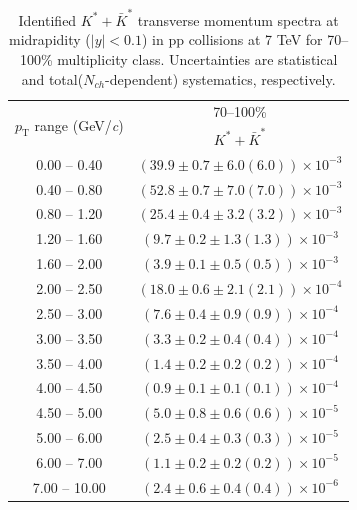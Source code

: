 \begin{table}
\caption{Identified $K^{*} + \bar{K}^{*}$ transverse momentum spectra at midrapidity ($|y|<0.1$) in pp collisions at 7 TeV for 70--100\% multiplicity class. Uncertainties are statistical and total($N_{ch}$-dependent) systematics, respectively.}
\label{tab:KStar_70to100}
\begin{center}
\begin{tabular}{ c | c }
\hline
\multirow{2}{*}{$p_{\mathrm{T}}$ range (GeV/\textit{c})} & \multicolumn{1}{c}{70--100\%} \\ & $K^{*} + \bar{K}^{*}$\\ 
\hline
0.00 -- 0.40 & $(39.9\pm0.7\pm6.0(6.0))\times10^{-3}$ \\ 
0.40 -- 0.80 & $(52.8\pm0.7\pm7.0(7.0))\times10^{-3}$ \\ 
0.80 -- 1.20 & $(25.4\pm0.4\pm3.2(3.2))\times10^{-3}$ \\ 
1.20 -- 1.60 & $(9.7\pm0.2\pm1.3(1.3))\times10^{-3}$ \\ 
1.60 -- 2.00 & $(3.9\pm0.1\pm0.5(0.5))\times10^{-3}$ \\ 
2.00 -- 2.50 & $(18.0\pm0.6\pm2.1(2.1))\times10^{-4}$ \\ 
2.50 -- 3.00 & $(7.6\pm0.4\pm0.9(0.9))\times10^{-4}$ \\ 
3.00 -- 3.50 & $(3.3\pm0.2\pm0.4(0.4))\times10^{-4}$ \\ 
3.50 -- 4.00 & $(1.4\pm0.2\pm0.2(0.2))\times10^{-4}$ \\ 
4.00 -- 4.50 & $(0.9\pm0.1\pm0.1(0.1))\times10^{-4}$ \\ 
4.50 -- 5.00 & $(5.0\pm0.8\pm0.6(0.6))\times10^{-5}$ \\ 
5.00 -- 6.00 & $(2.5\pm0.4\pm0.3(0.3))\times10^{-5}$ \\ 
6.00 -- 7.00 & $(1.1\pm0.2\pm0.2(0.2))\times10^{-5}$ \\ 
7.00 -- 10.00 & $(2.4\pm0.6\pm0.4(0.4))\times10^{-6}$ \\ 
\hline
\end{tabular}
\end{center}
\end{table}